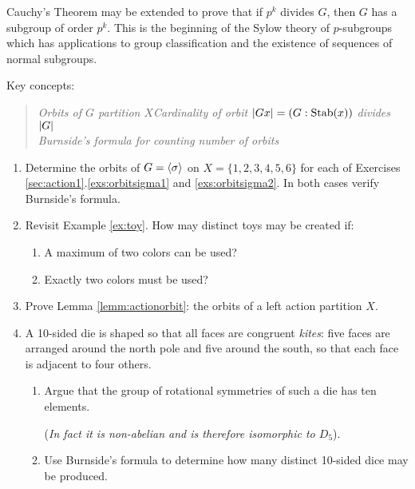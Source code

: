 Cauchy's Theorem may be extended to prove that if $p^k$ divides $G$, then $G$ has a subgroup of order $p^k$. This is the beginning of the Sylow theory of $p$-subgroups which has applications to group classification and the existence of sequences of normal subgroups. 


\goodbreak

\begin{exercises}{}{}
	Key concepts:
	\begin{quote}
		\emph{Orbits of $G$ partition $X$\qquad Cardinality of orbit $\left| Gx\right|=(G:\operatorname{Stab}(x))$ divides $\left| G\right|$\\
	Burnside's formula for counting number of orbits}
	\end{quote}
	
	\begin{enumerate}
	  \item Determine the orbits of $G=\left\langle \sigma\right\rangle$ on $X=\{1,2,3,4,5,6\}$ for each of Exercises \ref*{sec:action1}.\ref{exs:orbitsigma1} and \ref{exs:orbitsigma2}. In both cases verify Burnside's formula.
	  
	  
		\item Revisit Example \ref{ex:toy}. How may distinct toys may be created if:
		\begin{enumerate}
		  \item A maximum of two colors can be used?
		  \item Exactly two colors must be used?
		\end{enumerate}
		
	  
	  \item Prove Lemma \ref{lemm:actionorbit}: the orbits of a left action partition $X$.
	  
		
		\item A 10-sided die is shaped so that all faces are congruent \emph{kites}: five faces are arranged around the north pole and five around the south, so that each face is adjacent to four others.
		\begin{enumerate}
		  \item Argue that the group of rotational symmetries of such a die has ten elements.\par
		  (\emph{In fact it is non-abelian and is therefore isomorphic to $D_5$}).
		  \item Use Burnside's formula to determine how many distinct 10-sided dice may be produced.
		\end{enumerate}
		
	
	
	
	

\end{enumerate}
\end{exercises}
